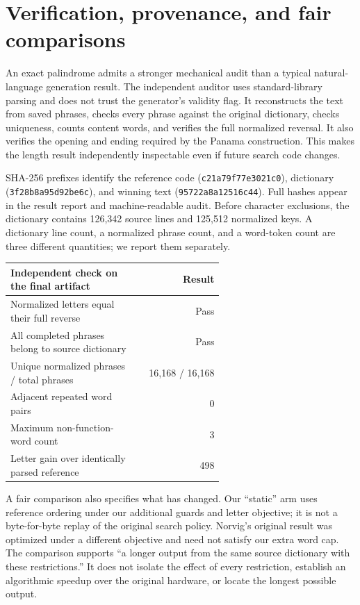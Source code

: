 \documentclass[11pt,letterpaper]{article}
\begin{document}
\section{Verification, provenance, and fair comparisons}
\label{sec:audit}
An exact palindrome admits a stronger mechanical audit than a typical natural-language generation result. The independent auditor uses standard-library parsing and does not trust the generator's validity flag. It reconstructs the text from saved phrases, checks every phrase against the original dictionary, checks uniqueness, counts content words, and verifies the full normalized reversal. It also verifies the opening and ending required by the Panama construction. This makes the length result independently inspectable even if future search code changes.

SHA-256 prefixes identify the reference code (\texttt{c21a79f77e3021c0}), dictionary (\texttt{3f28b8a95d92be6c}), and winning text (\texttt{95722a8a12516c44}). Full hashes appear in the result report and machine-readable audit. Before character exclusions, the dictionary contains 126,342 source lines and 125,512 normalized keys. A dictionary line count, a normalized phrase count, and a word-token count are three different quantities; we report them separately.

\begin{center}\small
\begin{tabular}{p{0.61\linewidth}r}\toprule
Independent check on the final artifact & Result\\\midrule
Normalized letters equal their full reverse & Pass\\
All completed phrases belong to source dictionary & Pass\\
Unique normalized phrases / total phrases & 16,168 / 16,168\\
Adjacent repeated word pairs & 0\\
Maximum non-function-word count & 3\\
Letter gain over identically parsed reference & 498\\\bottomrule
\end{tabular}
\end{center}

A fair comparison also specifies what has changed. Our ``static'' arm uses reference ordering under our additional guards and letter objective; it is not a byte-for-byte replay of the original search policy. Norvig's original result was optimized under a different objective and need not satisfy our extra word cap. The comparison supports ``a longer output from the same source dictionary with these restrictions.'' It does not isolate the effect of every restriction, establish an algorithmic speedup over the original hardware, or locate the longest possible output.
\end{document}
